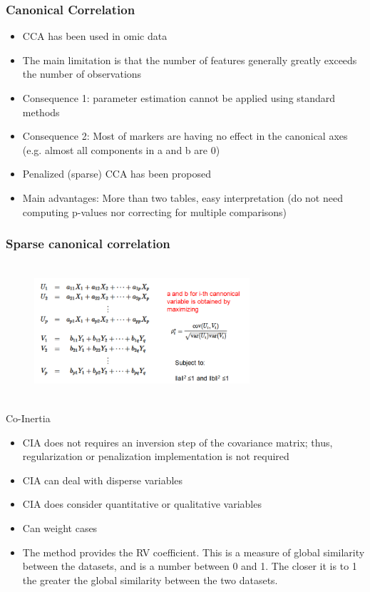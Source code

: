 \documentclass[10pt,xcolor=dvipsnames]{beamer}\usepackage[]{graphicx}\usepackage[]{color}
\begin{document}
\begin{frame}\frametitle{Canonical Correlation}

\begin{itemize}
\item CCA has been used in omic data
\item The main limitation is that the number of features generally greatly exceeds the number of observations
\item Consequence 1: parameter estimation cannot be applied using standard methods
\item  Consequence 2: Most of markers are having no effect in the canonical axes (e.g. almost all components in a and b are 0)
\item Penalized (sparse) CCA has been proposed
\item Main advantages: More than two tables, easy interpretation (do not need computing p-values nor correcting for multiple comparisons)
\end{itemize}

\end{frame}



\begin{frame}\frametitle{Sparse canonical correlation}

\begin{figure}
\begin{center}
 \includegraphics[height=5cm, width=8cm]{figures/mCCA.png}
\end{center}
\end{figure}

\end{frame}

\begin{frame}{Co-Inertia}

\begin{itemize}

  \item CIA does not requires an inversion step of the covariance matrix; thus, regularization or penalization implementation is not required
  \item CIA can deal with disperse variables
  \item CIA does consider quantitative or qualitative variables
  \item Can weight cases
  \item The method provides the RV coefficient. This is a measure of global similarity between the datasets, and is a number between 0 and 1. The closer it is to 1 the greater the global similarity between the two datasets. 
 \end{itemize}

\end{frame}
\end{document}
